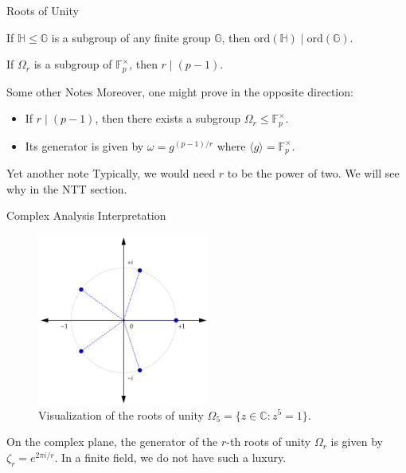 \documentclass{zkdl-presentation-template}
\begin{document}
    \begin{frame}{Roots of Unity}
        \begin{theorem}
            If $\mathbb{H} \leq \mathbb{G}$ is a subgroup of any finite group $\mathbb{G}$, then $\text{ord}(\mathbb{H}) \mid \text{ord}(\mathbb{G})$.
        \end{theorem}

        \begin{corollary}
            If $\Omega_r$ is a subgroup of $\mathbb{F}_p^{\times}$, then $r \mid
            (p - 1)$.
        \end{corollary}

        \begin{alertblock}{Some other Notes}
            Moreover, one might prove in the opposite direction:
            \begin{itemize}
                \item If $r \mid (p-1)$, then there exists a subgroup $\Omega_r
                \leq \mathbb{F}_p^{\times}$.
                \item Its generator is given by $\omega = g^{(p-1)/r}$ where 
                $\langle g \rangle = \mathbb{F}_p^{\times}$.
            \end{itemize} 
        \end{alertblock}

        \begin{block}{Yet another note}
            Typically, we would need $r$ to be the power of two. We will see why 
            in the NTT section.
        \end{block}
    \end{frame}

    \begin{frame}{Complex Analysis Interpretation}
        \begin{figure}
            \centering
            \includegraphics[width=0.5\textwidth]{images/lecture_13/roots.png}
            \caption{Visualization of the roots of unity $\Omega_5 = \{z \in \mathbb{C}: z^5=1 \}$.}
        \end{figure}

        On the complex plane, the generator of the $r$-th roots of unity
        $\Omega_r$ is given by $\zeta_r = e^{2\pi i/r}$. In a finite field,
        we do not have such a luxury.
    \end{frame}
\end{document}
